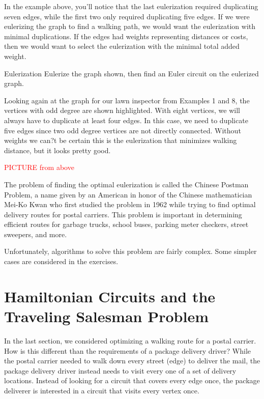 In the example above, you'll notice that the last eulerization required duplicating seven edges, while the first two only required duplicating five edges.  If we were eulerizing the graph to find a walking path, we would want the eulerization with minimal duplications.  If the edges had weights representing distances or costs, then we would want to select the eulerization with the minimal total added weight.

\begin{ex}{Eulerization}{}
Eulerize the graph shown, then find an Euler circuit on the eulerized graph.\\
\end{ex}

\begin{example}{}%
Looking again at the graph for our lawn inspector from Examples 1 and 8, the vertices with odd degree are shown highlighted.  With eight vertices, we will always have to duplicate at least four edges.  In this case, we need to duplicate five edges since two odd degree vertices are not directly connected.  Without weights we can?t be certain this is the eulerization that minimizes walking distance, but it looks pretty good.

\textcolor{red}{PICTURE from above}
\end{example}

The problem of finding the optimal eulerization is called the Chinese Postman Problem, a name given by an American in honor of the Chinese mathematician Mei-Ko Kwan who first studied the problem in 1962 while trying to find optimal delivery routes for postal carriers.   This problem is important in determining efficient routes for garbage trucks, school buses, parking meter checkers, street sweepers, and more.

Unfortunately, algorithms to solve this problem are fairly complex.  Some simpler cases are considered in the exercises.

\section{Hamiltonian Circuits and the Traveling Salesman Problem}
In the last section, we considered optimizing a walking route for a postal carrier.  How is this different than the requirements of a package delivery driver?  While the postal carrier needed to walk down every street (edge) to deliver the mail, the package delivery driver instead needs to visit every one of a set of delivery locations.  Instead of looking for a circuit that covers every edge once, the package deliverer is interested in a circuit that visits every vertex once.

